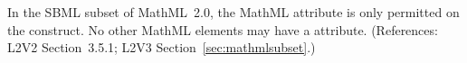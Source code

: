 In the SBML subset of MathML~2.0, the MathML attribute
 is only permitted on the  construct.
No other MathML elements may have a  attribute.
(References: L2V2 Section~3.5.1; L2V3 Section~\ref{sec:mathmlsubset}.)
